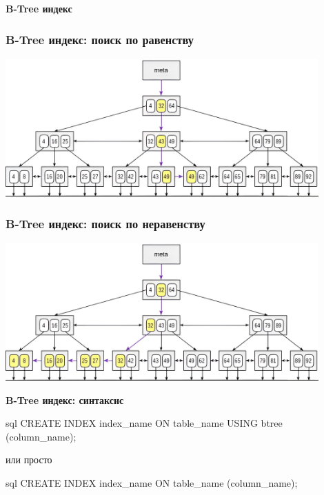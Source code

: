 \documentclass[aspectratio=169]{beamer}
\begin{document}
\begin{frame}
  \vspace*{1em}
  \begin{center}
    {\huge \textbf{B-Tree индекс}}
  \end{center}
\end{frame}

\begin{frame}
  \frametitle{B-Tree индекс: поиск по равенству}

  \centering
  \includegraphics[width=0.9\textwidth]{images/b-tree/equal.png}
\end{frame}

\begin{frame}
  \frametitle{B-Tree индекс: поиск по неравенству}

  \centering
  \includegraphics[width=0.9\textwidth]{images/b-tree/less.png}
\end{frame}

\begin{frame}[fragile]
  \begin{center}
    {\Large \textbf{B-Tree индекс: синтаксис}}

    \vspace*{1em}

    \begin{cminted}{sql}
      CREATE INDEX index_name ON table_name USING btree (column_name);
    \end{cminted}

    \vspace*{1em}

    или просто

    \vspace*{1em}

    \begin{cminted}{sql}
      CREATE INDEX index_name ON table_name (column_name);
    \end{cminted}
  \end{center}
\end{frame}
\end{document}
